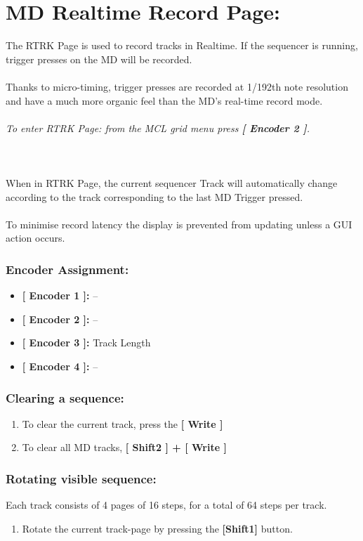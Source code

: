 \chapter{MD Realtime Record Page:}

The RTRK Page is used to record tracks in Realtime. If the sequencer is running, trigger presses on the MD will be recorded.\\
\\
Thanks to micro-timing, trigger presses are recorded at 1/192th note resolution and have a much more organic feel than the MD’s real-time record mode.\\\\
\textit{To enter RTRK Page: from the MCL grid menu press \textbf{[ Encoder 2 ]}.}\\
\\
\\
\\
When in RTRK Page, the current sequencer Track will automatically change according to the track corresponding to the last MD Trigger pressed.\\
\\To minimise record latency the display is prevented from updating unless a GUI action occurs. 
\subsection{Encoder Assignment:}
\begin{itemize}
	\item \textbf{[ Encoder 1 ]: } --
	\item \textbf{[ Encoder 2 ]: } --
	\item \textbf{[ Encoder 3 ]: } Track Length
	\item \textbf{[ Encoder 4 ]: } --
\end{itemize}
\subsection{Clearing a sequence:}
\begin{enumerate}
	\item To clear the current track, press the\textbf{ [ Write ]}
	\item To clear all MD tracks,  \textbf{[ Shift2 ] + [ Write ]}
\end{enumerate}
\subsection{Rotating visible sequence:}
Each track consists of 4 pages of 16 steps, for a total of 64 steps per track.
\begin{enumerate}
	\item Rotate the current track-page by pressing the \textbf{[Shift1] }button.
\end{enumerate}
